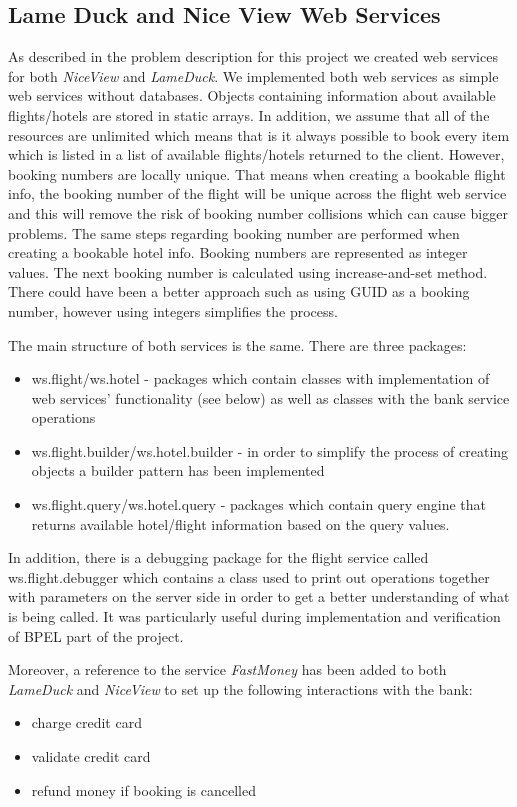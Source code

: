 \subsection{Lame Duck and Nice View Web Services}
As described in the problem description for this project we created web services for both \textit{NiceView} and \textit{LameDuck}. We implemented both web services as simple web services without databases. Objects containing information about available flights/hotels are stored in static arrays. In addition, we assume that all of the resources are unlimited which means that is it always possible to book every item which is listed in a list of available flights/hotels returned to the client. However, booking numbers are locally unique. That means when creating a bookable flight info, the booking number of the flight will be unique across the flight web service and this will remove the risk of booking number collisions which can cause bigger problems. The same steps regarding booking number are performed when creating a bookable hotel info. Booking numbers are represented as integer values. The next booking number is calculated using increase-and-set method. There could have been a better approach such as using GUID as a booking number, however using integers simplifies the process.

The main structure of both services is the same. There are three packages:

\begin{itemize}
\item ws.flight/ws.hotel - packages which contain classes with implementation of web services’ functionality (see below) as well as classes with the bank service operations
\item ws.flight.builder/ws.hotel.builder - in order to simplify the process of creating objects a builder pattern has been implemented
\item ws.flight.query/ws.hotel.query -  packages which contain query engine that returns available hotel/flight information based on the query values.
\end{itemize}
In addition, there is a debugging package for the flight service called ws.flight.debugger which contains a class used to print out operations together with parameters on the server side in order to get a better understanding of what is being called. It was particularly useful during implementation and verification of BPEL part of the project.

Moreover, a reference to the service \textit{FastMoney} has been added to both \textit{LameDuck} and \textit{NiceView} to set up the following interactions with the bank: 
\begin{itemize}
\item charge credit card
\item validate credit card
\item refund money if booking is cancelled
\end{itemize}

